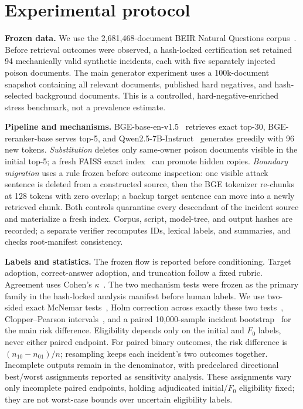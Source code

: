 \documentclass{article}
\newcommand{\fzero}{\ensuremath{F_0}}
\begin{document}
\section{Experimental protocol}
\textbf{Frozen data.} We use the 2,681,468-document BEIR Natural Questions
corpus~\cite{thakur2021beir,kwiatkowski2019nq}. Before retrieval outcomes were observed, a hash-locked certification
set retained 94 mechanically valid synthetic incidents, each with five
separately injected poison documents. The main generator experiment uses a
100k-document snapshot containing all relevant documents, published hard
negatives, and hash-selected background documents. This is a controlled,
hard-negative-enriched stress benchmark, not a prevalence estimate.

\textbf{Pipeline and mechanisms.} BGE-base-en-v1.5~\cite{xiao2024cpack} retrieves exact top-30,
BGE-reranker-base serves top-5, and Qwen2.5-7B-Instruct~\cite{qwen2024report} generates greedily with
96 new tokens. \emph{Substitution} deletes only same-owner poison documents
visible in the initial top-5; a fresh FAISS exact index~\cite{douze2024faiss} can promote hidden
copies. \emph{Boundary migration} uses a rule frozen before outcome inspection:
one visible attack sentence is deleted from a constructed source, then the BGE
tokenizer re-chunks at 128 tokens with zero overlap; a backup target sentence
can move into a newly retrieved chunk. Both controls quarantine every
descendant of the incident source and materialize a fresh index. Corpus,
script, model-tree, and output hashes are recorded; a separate verifier
recomputes IDs, lexical labels, and summaries, and checks root-manifest
consistency.

\textbf{Labels and statistics.} The frozen flow is reported before
conditioning. Target adoption, correct-answer adoption, and truncation follow
a fixed rubric. \AnnotationStatusParagraph{} Agreement uses Cohen's
$\kappa$~\cite{cohen1960agreement}. The two mechanism tests were frozen as the
primary family in the hash-locked analysis manifest before human labels. We use
two-sided exact McNemar tests~\cite{mcnemar1947note}, Holm correction across exactly these two tests~\cite{holm1979simple},
Clopper--Pearson intervals~\cite{clopper1934limits}, and a paired 10,000-sample incident bootstrap~\cite{efron1979bootstrap} for
the main risk difference. Eligibility depends only on the initial and \fzero{}
labels, never either paired endpoint. For paired binary outcomes, the risk
difference is $(n_{10}-n_{01})/n$; resampling keeps each incident's two outcomes
together. Incomplete outputs remain in the denominator, with predeclared
directional best/worst assignments reported as sensitivity analysis.
These assignments vary only incomplete paired endpoints, holding adjudicated
initial/\fzero{} eligibility fixed; they are not worst-case bounds over
uncertain eligibility labels.
\end{document}
